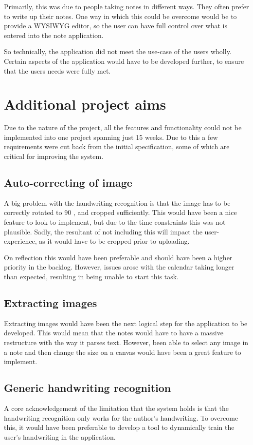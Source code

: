 Primarily, this was due to people taking notes in different ways. They often prefer to write up their notes. One way in which this could be overcome would be to provide a WYSIWYG editor, so the user can have full control over what is entered into the note application.

So technically, the application did not meet the use-case of the users wholly. Certain aspects of the application would have to be developed further, to ensure that the users needs were fully met.

\section{Additional project aims}
Due to the nature of the project, all the features and functionality could not be implemented into one project spanning just 15 weeks. Due to this a few requirements were cut back from the initial specification, some of which are critical for improving the system.

\subsection{Auto-correcting of image}
A big problem with the handwriting recognition is that the image has to be correctly rotated to 90 \textdegree, and cropped sufficiently. This would have been a nice feature to look to implement, but due to the time constraints this was not plausible. Sadly, the resultant of not including this will impact the user-experience, as it would have to be cropped prior to uploading.

On reflection this would have been preferable and should have been a higher priority in the backlog. However, issues arose with the calendar taking longer than expected, resulting in being unable to start this task.

\subsection{Extracting images}
Extracting images would have been the next logical step for the application to be developed. This would mean that the notes would have to have a massive restructure with the way it parses text. However, been able to select any image in a note and then change the size on a canvas would have been a great feature to implement.

\subsection{Generic handwriting recognition}
A core acknowledgement of the limitation that the system holds is that the handwriting recognition only works for the author's handwriting. To overcome this, it would have been preferable to develop a tool to dynamically train the user's handwriting in the application.

